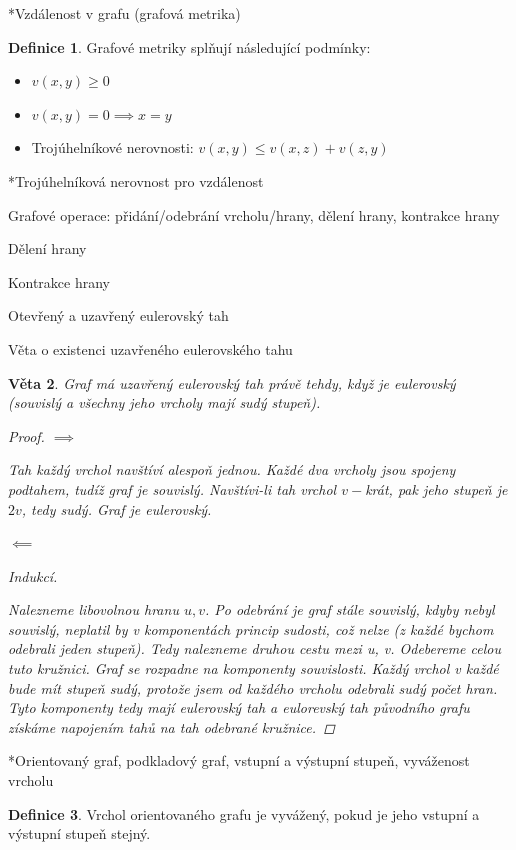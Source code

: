 \documentclass[10pt,a4paper]{article}
\theoremstyle{plain}
\newtheorem{veta}{Věta}
\theoremstyle{definition}
\newtheorem{definice}[veta]{Definice}
\begin{document}
*Vzdálenost v grafu (grafová metrika)

\begin{definice}
Grafové metriky splňují následující podmínky:\begin{itemize}
\item $v(x, y) \geq 0$
\item $v(x, y) = 0 \implies x = y$
\item Trojúhelníkové nerovnosti: $v(x, y) \leq v(x, z) + v(z, y)$
\end{itemize}
\end{definice}

*Trojúhelníková nerovnost pro vzdálenost

Grafové operace: přidání/odebrání vrcholu/hrany, dělení hrany, kontrakce hrany

Dělení hrany

Kontrakce hrany

Otevřený a uzavřený eulerovský tah

Věta o existenci uzavřeného eulerovského tahu

\begin{veta}
Graf má uzavřený eulerovský tah právě tehdy, když je  eulerovský (souvislý a všechny jeho vrcholy mají sudý stupeň).
\begin{proof}
$\implies$ 

Tah každý vrchol navštíví alespoň jednou. Každé dva vrcholy jsou spojeny podtahem, tudíž graf je souvislý. Navštívi-li tah vrchol $v-$krát, pak jeho stupeň je $2v$, tedy sudý. Graf je eulerovský.

$\impliedby$

Indukcí.

Nalezneme libovolnou hranu ${u,v}$. Po odebrání je graf stále souvislý, kdyby nebyl souvislý, neplatil by v komponentách princip sudosti, což nelze (z každé bychom odebrali jeden stupeň). Tedy nalezneme druhou cestu mezi u, v. Odebereme celou tuto kružnici. Graf se rozpadne na komponenty souvislosti. Každý vrchol v každé bude mít stupeň sudý, protože jsem od každého vrcholu odebrali sudý počet hran. Tyto komponenty tedy mají eulerovský tah a eulorevský tah původního grafu získáme napojením tahů na tah odebrané kružnice.
\end{proof}
\end{veta}

*Orientovaný graf, podkladový graf, vstupní a výstupní stupeň, vyváženost vrcholu

\begin{definice}
Vrchol orientovaného grafu je vyvážený, pokud je jeho vstupní a výstupní stupeň stejný.
\end{definice}
\end{document}
